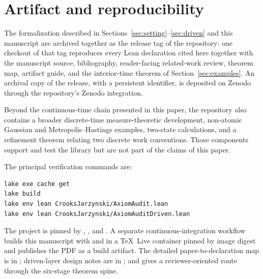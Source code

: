 \section{Artifact and reproducibility}
\label{sec:artifact}

The formalization described in Sections~\ref{sec:setting}--\ref{sec:driven} and this manuscript are archived together as the release tag \artifactbase{} of the repository: one checkout of that tag reproduces every Lean declaration cited here together with the manuscript source, bibliography, reader-facing related-work review, theorem map, artifact guide, and the interior-time theorem of Section~\ref{sec:examples}. An archival copy of the release, with a persistent identifier, is deposited on Zenodo through the repository's Zenodo integration.

Beyond the continuous-time chain presented in this paper, the repository also contains a broader discrete-time measure-theoretic development, non-atomic Gaussian and Metropolis--Hastings examples, two-state calculations, and a refinement theorem relating two discrete work conventions. Those components support and test the library but are not part of the claims of this paper.

The principal verification commands are:
\begin{verbatim}
lake exe cache get
lake build
lake env lean CrooksJarzynski/AxiomAudit.lean
lake env lean CrooksJarzynski/AxiomAuditDriven.lean
\end{verbatim}
The project is pinned by , , and . A separate continuous-integration workflow builds this manuscript with  and  in a TeX~Live container pinned by image digest and publishes the PDF as a build artifact. The detailed paper-to-declaration map is in ; driven-layer design notes are in ; and  gives a reviewer-oriented route through the six-stage theorem spine.

